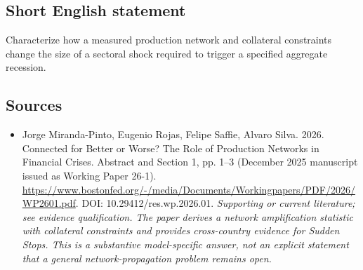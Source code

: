 \documentclass[11pt]{article}
\begin{document}
\subsection{Short English statement}
Characterize how a measured production network and collateral constraints change the size of a sectoral shock required to trigger a specified aggregate recession.

\subsection{Sources}
\begin{itemize}\raggedright
\item[\textnormal{[S1]}]\hypertarget{source:30007513:1}{} Jorge Miranda-Pinto, Eugenio Rojas, Felipe Saffie, Alvaro Silva. 2026. Connected for Better or Worse? The Role of Production Networks in Financial Crises. Abstract and Section 1, pp. 1–3 (December 2025 manuscript issued as Working Paper 26-1).
\url{https://www.bostonfed.org/-/media/Documents/Workingpapers/PDF/2026/WP2601.pdf}.
DOI: 10.29412/res.wp.2026.01.
{\small\textit{Supporting or current literature; see evidence qualification. The paper derives a network amplification statistic with collateral constraints and provides cross-country evidence for Sudden Stops. This is a substantive model-specific answer, not an explicit statement that a general network-propagation problem remains open.}}
\end{itemize}
\end{document}
